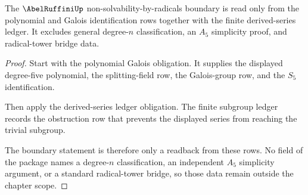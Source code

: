 \begin{theorem}
\label{thm:abelruffini-nonradical-boundary-obligation}
The $\AbelRuffiniUp$ non-solvability-by-radicals boundary is read only from the
polynomial and Galois identification rows together with the finite
derived-series ledger. It excludes general degree-$n$ classification, an
$A_5$ simplicity proof, and radical-tower bridge data.
\end{theorem}
\begin{proof}
Start with the polynomial Galois obligation. It supplies the displayed
degree-five polynomial, the splitting-field row, the Galois-group row, and the
$S_5$ identification.

Then apply the derived-series ledger obligation. The finite subgroup ledger
records the obstruction row that prevents the displayed series from reaching the
trivial subgroup.

The boundary statement is therefore only a readback from these rows. No field of
the package names a degree-$n$ classification, an independent $A_5$ simplicity
argument, or a standard radical-tower bridge, so those data remain outside the
chapter scope.
\end{proof}

